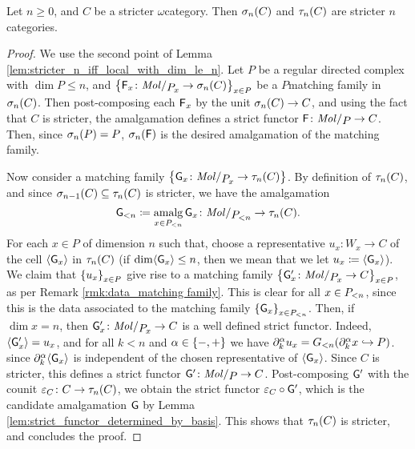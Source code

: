 \begin{lem} \label{lem:truncation_stricter_are_stricter}
    Let \( n \geq 0 \), and \( C \) be a stricter \( \omega \)\nbd category.
    Then \( \skel{n}(C) \) and \( \trunc{n}(C) \) are stricter \( n \)\nbd categories.
\end{lem}
\begin{proof}
    We use the second point of Lemma \ref{lem:stricter_n_iff_local_with_dim_le_n}.
    Let \( P \) be a regular directed complex with \( \dim P \le n \), and \( \set{\F_x \colon \molecin{\imel{P}{x}} \to \skel{n}(C)}_{x \in P} \) be a \( P \)\nbd matching family in \( \skel{n}(C) \).
    Then post-composing each \( \F_x \) by the unit \( \skel{n}(C) \to C \), and using the fact that \( C \) is stricter, the amalgamation defines a strict functor \( \F \colon \molecin{P} \to C \).
    Then, since \( \skel{n}(P) = P \), \( \skel{n}(\F) \) is the desired amalgamation of the matching family.

    Now consider a matching family \( \set{\G_x \colon \molecin{\imel{P}{x}} \to \trunc{n}(C)} \).
    By definition of \( \trunc{n}(C) \), and since \( \skel{n - 1}(C) \subseteq \trunc{n}(C) \) is stricter, we have the amalgamation
    \begin{equation*}
        \gr{< n }{\G} \eqdef \amalg_{x \in \gr{< n}{P}} \G_x \colon \molecin{\gr{< n}{P}} \to \trunc{n}(C).
    \end{equation*}
    For each \( x \in P \) of dimension \( n \) such that, choose a representative \( u_x \colon W_x \to C \) of the cell \( \pcell{\G_x} \) in \( \trunc{n}(C) \) (if \( \dim \pcell{\G_x} \le n \), then we mean that we let \( u_x \eqdef \pcell{\G_x} \)).
    We claim that \( \set{u_x}_{x \in P} \) give rise to a matching family \( \set{\G'_x \colon \molecin{\imel{P}{x}} \to C}_{x \in P} \), as per Remark \ref{rmk:data_matching family}.
    This is clear for all \( x \in \gr{< n}{P} \), since this is the data associated to the matching family \( \set{\G_x}_{x \in \gr{< n}{P}} \). 
    Then, if \( \dim x = n \), then \( \G'_x \colon \molecin{\imel{P}{x}} \to C \) is a well defined strict functor.
    Indeed, \( \pcell{\G'_x} = u_x \), and for all \( k < n \) and \( \a \in \set{-, +} \) we have \( \bd{k}{\a} u_x = \gr{< n}{G}(\bd{k}{\a} x \incl P ) \).
    since \( \bd{k}{\a} \pcell{\G_x} \) is independent of the chosen representative of \( \pcell{\G_x} \).
    Since \( C \) is stricter, this defines a strict functor \( \G' \colon \molecin{P} \to C \). 
    Post-composing \( \G' \) with the counit \( \varepsilon_C \colon C \to \trunc{n}(C) \), we obtain the strict functor \( \varepsilon_C \after \G' \), which is the candidate amalgamation \( \G \) by Lemma \ref{lem:strict_functor_determined_by_basis}.
    This shows that \( \trunc{n}(C) \) is stricter, and concludes the proof.
\end{proof}

